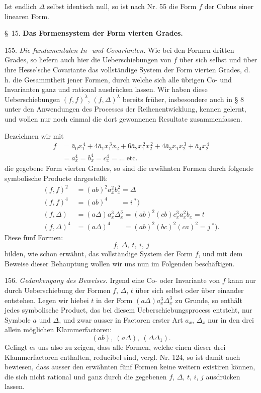 \documentclass[11pt]{article}
\providecommand{\weberpage}[1]{}
\let\Delta\varDelta
\begin{document}
Ist endlich $\Delta$ selbst identisch null, so ist nach Nr. 55 die Form $f$ der Cubus einer linearen Form.

\begin{center}
\S\ 15. \textbf{Das Formensystem der Form vierten Grades.}
\end{center}

155. \textit{Die fundamentalen In- und Covarianten.} Wie bei den Formen dritten Grades, so liefern auch hier die Ueberschiebungen von $f$ über sich selbst und über ihre Hesse'sche Covariante das vollständige System der Form vierten Grades, d. h. die Gesammtheit jener Formen, durch welche sich alle übrigen Co- und Invarianten ganz und rational ausdrücken lassen. Wir haben diese Ueberschiebungen $(f,f)^\lambda$, $(f,\Delta)^\lambda$ bereits früher, insbesondere auch in § 8 unter den Anwendungen des Processes der Reihenentwicklung, kennen gelernt, und wollen nur noch einmal die dort gewonnenen Resultate zusammenfassen.


\weberpage{179}

Bezeichnen wir mit
\[
\begin{aligned}
f&=\bar a_0x_1^{\,4}+4\bar a_1x_1^{\,3}x_2+6\bar a_2x_1^{\,2}x_2^{\,2}+4\bar a_3x_1x_2^{\,3}+\bar a_4x_2^{\,4}\\
&=a_x^4=b_x^4=c_x^4=\dots\ \text{etc.}
\end{aligned}
\]
die gegebene Form vierten Grades, so sind die erwähnten Formen durch folgende symbolische Producte dargestellt:
\[
\begin{aligned}
(f,f)^2&=(ab)^2a_x^2b_x^2=\Delta\\
(f,f)^4&=(ab)^4\phantom{a_x^2b_x^2}=i\ {}^{\ast})\\
(f,\Delta)&=(a\Delta)a_x^3\Delta_x^3=(ab)^2(cb)c_x^3a_x^2b_x=t\\
(f,\Delta)^4&=(a\Delta)^4\phantom{a_x^2b_x^2}=(ab)^2(bc)^2(ca)^2=j\ {}^{\ast}).
\end{aligned}
\]
Diese fünf Formen:
\[
f,\ \Delta,\ t,\ i,\ j
\]
bilden, wie schon erwähnt, das vollständige System der Form $f$, und mit dem Beweise dieser Behauptung wollen wir uns nun im Folgenden beschäftigen.

156. \textit{Gedankengang des Beweises.} Irgend eine Co- oder Invariante von $f$ kann nur durch Ueberschiebung der Formen $f$, $\Delta$, $t$ über sich selbst oder über einander entstehen. Legen wir hiebei $t$ in der Form $(a\Delta)a_x^3\Delta_x^3$ zu Grunde, so enthält jedes symbolische Product, das bei diesem Ueberschiebungsprocess entsteht, nur Symbole $a$ und $\Delta$, und zwar ausser in Factoren erster Art $a_x$, $\Delta_x$ nur in den drei allein möglichen Klammerfactoren:
\[
(ab),\ (a\Delta),\ (\Delta\Delta_1).
\]
Gelingt es uns also zu zeigen, dass alle Formen, welche einen dieser drei Klammerfactoren enthalten, reducibel sind, vergl. Nr. 124, so ist damit auch bewiesen, dass ausser den erwähnten fünf Formen keine weitern existiren können, die sich nicht rational und ganz durch die gegebenen $f$, $\Delta$, $t$, $i$, $j$ ausdrücken lassen.
\end{document}
